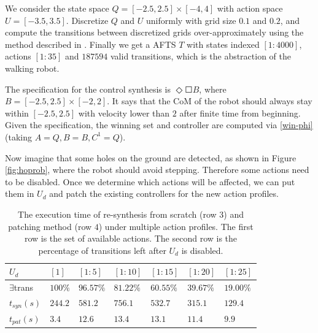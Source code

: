 {\color{black} We consider } the state space $ Q = [-2.5,2.5]\times [-4,4] $ with action space $ U = [-3.5,3.5] $. Discretize $ Q $ and $ U $ uniformly with grid size $ 0.1 $ and $ 0.2 $, and compute the transitions between discretized grids over-approximately  using the method described in \cite{Liu2014,Sun2014}. Finally we get a AFTS $ T $ with states indexed $ [1:4000] $, actions $ [1:35] $ and $ 187594 $ valid transitions, which is the abstraction of the walking robot. 

The specification for the control synthesis is $ \Diamond \Square B $,
where $ B=[-2.5,2.5]\times[-2,2] $. It says that the CoM of the robot should always stay within $ [-2.5,2.5] $ with velocity lower than $ 2 $ after finite time from beginning. Given the specification, the winning set and controller are computed via \eqref{win-phi} (taking $ A = Q,B=B , C^1 = Q $).

Now imagine that some holes on the ground are detected, as shown in Figure \ref{fig:hoprob}, where the robot should avoid stepping. Therefore some actions need to be disabled. Once we determine which actions will be affected, we can put them in $ U_d $ and patch the existing controllers for the new action profiles.
\begin{table}
	\centering
	\caption{The execution time of re-synthesis from scratch (row $ 3 $) and patching method (row $ 4 $) under multiple action profiles. The first row is the set of available actions. The second row is the percentage of transitions left after $ U_d $ is disabled.}
	\begin{tabular}{lllllll}
		\hline 
		$ U_d $ & $ [1] $ &$ [1:5] $ & $ [1:10] $ & $ [1:15] $ & $ [1:20] $ & $ [1:25] $ \\ 
		\hline 
		$ \exists $trans & $ 100\% $ & $ 96.57\% $ & $ 81.22\% $ & $ 60.55\% $ & $ 39.67\% $ & $ 19.00\% $\\
		$ t_{syn}(s) $ & $ 244.2 $ & $ 581.2 $ & $ 756.1 $ & $ 532.7 $ & $ 315.1 $ & $ 129.4 $ \\
		$ t_{pat}(s)$ & $ 3.4 $ & $ 12.6 $ & $ 13.4 $ & $ 13.1 $ & $ 11.4 $ & $ 9.9 $ \\ 
		\hline 
	\end{tabular} 
	\label{tab: exper}
\end{table}

